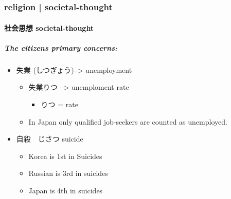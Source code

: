 \documentclass{article}
\newcommand\tabni[1][0.2cm]{\hspace*{#1}}
\begin{document}

\tableofcontents
\newpage

\part{}
\section{ \tabni religion |  \tabni societal-thought }
\subsection{社会思想 \tabni societal-thought}
\subsubsection{The citizens primary concerns:}
\begin{itemize}%
\item 失業 (しつぎょう)--> unemployment
\begin{itemize}
\item 失業りつ --> unemploment rate
\begin{itemize}%
\item りつ = rate
\end{itemize}
\item In Japan only qualified job-seekers are counted as unemployed.
\end{itemize}
\item 自殺　じさつ suicide
\begin{itemize}%
\item Korea is 1st in Suicides
\item Russian is 3rd in suicides
\item Japan is 4th in suicides \\
\end{itemize}
\end{itemize}
\end{document}
